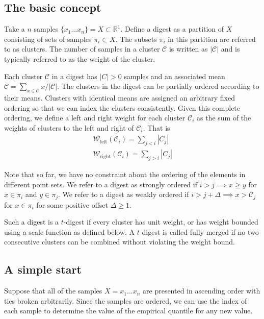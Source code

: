 \documentclass[11pt]{amsart}
\begin{document}
\subsection{The basic concept}
Take a $n$ samples $\lbrace x_1 \ldots x_n \rbrace = X \subset \mathbb R^1$. Define a digest  as a partition of $X$ consisting of  sets of samples $\pi_i \subset X$. The subsets $\pi_i$  in this partition are referred to as clusters. The number of samples in a cluster $\mathcal C$ is written as $|\mathcal C|$ and is typically referred to as the weight of the cluster.
 
Each cluster $\mathcal C$ in a digest has $|C|>0$ samples and an associated mean $\overline {\mathcal C} = \sum_{x\in \mathcal C} x / |\mathcal C|$. The clusters in the digest can be partially ordered according to their means. Clusters with identical means are assigned an arbitrary fixed ordering so that we can index the clusters consistently. Given this complete ordering, we define a left and right weight for each cluster $\mathcal C_i$ as the sum of the weights of clusters to the left and right of $\mathcal C_i$. That is
\begin{align*}
\mathcal W_{\mathrm{left}}(\mathcal C_i) = \sum_{j < i} |C_j| \\
\mathcal W_{\mathrm{right}}(\mathcal C_i) = \sum_{j > i} |C_j|
\end{align*}

Note that so far, we have no constraint about the ordering of the elements in different point sets. We refer to a digest as strongly ordered if $ i > j \implies x \ge y$ for $x \in \pi_i $ and $ y \in \pi_j$. We refer to a digest as weakly ordered if $i > j+\Delta \implies x > \overline {\mathcal C}_j$ for $x \in \pi_i$ for some positive offset $\Delta\ge 1$.

Such a digest is a $t$-digest if every cluster has unit weight, or has weight bounded using a scale function as defined below. A $t$-digest is called fully merged if no two consecutive clusters can be combined without violating the weight bound.

\subsection{A simple start}

Suppose that all of the samples $X=x_1 \ldots x_n$ are presented in ascending order with ties broken arbitrarily. Since the samples are ordered, we can use the index of each sample to determine the value of the empirical quantile for any new value. 
\end{document}
